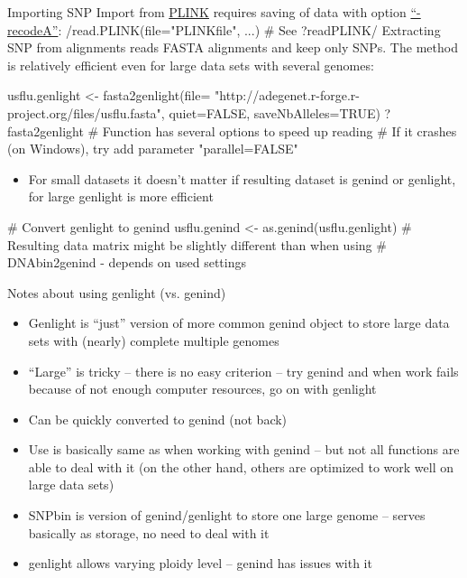 \documentclass[compress, ucs, xelatex, 11pt, xcolor=svgnames,
  hyperref={
    bookmarks=true,
    unicode=true,
    colorlinks=true,
    pdftitle={Molecular data in R},
    plainpages=false,
    pdfauthor={Vojtech Zeisek},
    pdfsubject={Course about phylogeny and evolution in R},
    pdfcreator={XeLaTeX},
    pdfkeywords={R, evolution, phylogeny, molecular data},
    linkcolor=Tomato,
    anchorcolor=SaddleBrown,
    citecolor=Goldenrod,
    filecolor=DarkMagenta,
    menucolor=Sienna,
    urlcolor=DarkTurquoise,
    pdftex},
  url={hyphens, lowtilde} %
  ]{beamer}
\begin{document}
\begin{frame}[fragile]{Importing SNP}
Import from \href{http://pngu.mgh.harvard.edu/~purcell/plink/}{PLINK} requires saving of data with option \href{http://pngu.mgh.harvard.edu/~purcell/plink/dataman.shtml#recode}{``-recodeA''}:
\splus/read.PLINK(file="PLINKfile", ...) # See ?readPLINK/
Extracting SNP from alignments reads FASTA alignments and keep only SNPs. The method is relatively efficient even for large data sets with several genomes:
  \begin{spluscode}
    usflu.genlight <- fasta2genlight(file=
      "http://adegenet.r-forge.r-project.org/files/usflu.fasta",
      quiet=FALSE, saveNbAlleles=TRUE)
    ?fasta2genlight # Function has several options to speed up reading
    # If it crashes (on Windows), try add parameter "parallel=FALSE"
  \end{spluscode}
\begin{itemize}
 \item For small datasets it doesn't matter if resulting dataset is genind or genlight, for large genlight is more efficient
\end{itemize}
  \begin{spluscode}
    # Convert genlight to genind
    usflu.genind <- as.genind(usflu.genlight)
    # Resulting data matrix might be slightly different than when using
    # DNAbin2genind - depends on used settings
  \end{spluscode}
\end{frame}

\begin{frame}{Notes about using genlight (vs. genind)}
\begin{itemize}
 \item Genlight is ``just'' version of more common genind object to store large data sets with (nearly) complete multiple genomes
 \item ``Large'' is tricky -- there is no easy criterion -- try genind and when work fails because of not enough computer resources, go on with genlight
 \item Can be quickly converted to genind (not back)
 \item Use is basically same as when working with genind -- but not all functions are able to deal with it (on the other hand, others are optimized to work well on large data sets)
 \item SNPbin is version of genind/genlight to store one large genome -- serves basically as storage, no need to deal with it
 \item genlight allows varying ploidy level -- genind has issues with it
\end{itemize}
\end{frame}
\end{document}
